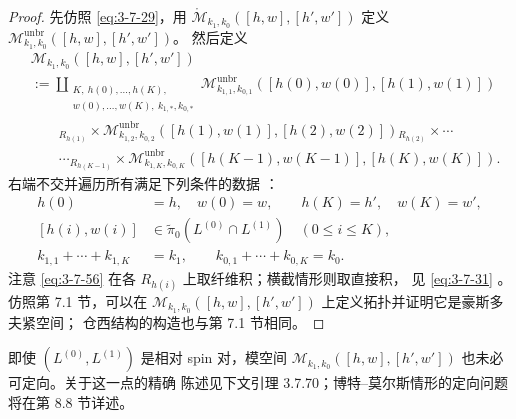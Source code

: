 \begin{proof}
先仿照 \eqref{eq:3-7-29}，用
$\mathring{\mathcal M}_{k_1,k_0}([h,w],[h',w'])$ 定义
$\mathcal M^{\mathrm{unbr}}_{k_1,k_0}([h,w],[h',w'])$。
然后定义
\begin{equation}
\begin{aligned}
 &\mathcal M_{k_1,k_0}([h,w],[h',w'])\\
 &:=
 \coprod_{\substack{
 K,\ h(0),\ldots,h(K),\\
 w(0),\ldots,w(K),\
 k_{1,*},k_{0,*}}}
 \mathcal M^{\mathrm{unbr}}_{k_{1,1},k_{0,1}}
 ([h(0),w(0)],[h(1),w(1)])\\
 &\qquad{}_{R_{h(1)}}\!\times
 \mathcal M^{\mathrm{unbr}}_{k_{1,2},k_{0,2}}
 ([h(1),w(1)],[h(2),w(2)])
 {}_{R_{h(2)}}\!\times\cdots\\
 &\qquad\cdots{}_{R_{h(K-1)}}\!\times
 \mathcal M^{\mathrm{unbr}}_{k_{1,K},k_{0,K}}
 ([h(K-1),w(K-1)],[h(K),w(K)]).
\end{aligned}
\tag{3.7.56}\label{eq:3-7-56}
\end{equation}
右端不交并遍历所有满足下列条件的数据
：
\begin{align}
 h(0)&=h,\quad w(0)=w,\qquad
 h(K)=h',\quad w(K)=w',
\tag{3.7.57.1}\label{eq:3-7-57-1}\\
 [h(i),w(i)]&\in
 \widetilde\pi_0(L^{(0)}\cap L^{(1)})
 \quad(0\leq i\leq K),
\tag{3.7.57.2}\label{eq:3-7-57-2}\\
 k_{1,1}+\cdots+k_{1,K}&=k_1,\qquad
 k_{0,1}+\cdots+k_{0,K}=k_0.
\tag{3.7.57.3}\label{eq:3-7-57-3}
\end{align}
注意 \eqref{eq:3-7-56} 在各 $R_{h(i)}$ 上取纤维积；横截情形则取直接积，
见 \eqref{eq:3-7-31}
。仿照第 7.1 节，可以在
$\mathcal M_{k_1,k_0}([h,w],[h',w'])$ 上定义拓扑并证明它是豪斯多夫紧空间；
仓西结构的构造也与第 7.1 节相同。
\end{proof}

即使 $(L^{(0)},L^{(1)})$ 是相对 spin 对，模空间
$\mathcal M_{k_1,k_0}([h,w],[h',w'])$ 也未必可定向。关于这一点的精确
陈述见下文引理 3.7.70；博特--莫尔斯情形的定向问题将在第 8.8 节详述。

